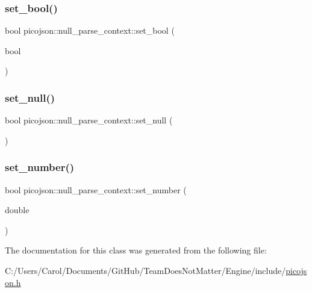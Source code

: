 \subsubsection{\texorpdfstring{set\+\_\+bool()}{set\_bool()}}
{\footnotesize\ttfamily bool picojson\+::null\+\_\+parse\+\_\+context\+::set\+\_\+bool (\begin{DoxyParamCaption}\item[{bool}]{ }\end{DoxyParamCaption})\hspace{0.3cm}{\ttfamily [inline]}}

\hypertarget{classpicojson_1_1null__parse__context_ad142ddadd513e41324f8d0515a19df2c}{}\label{classpicojson_1_1null__parse__context_ad142ddadd513e41324f8d0515a19df2c} 
\subsubsection{\texorpdfstring{set\+\_\+null()}{set\_null()}}
{\footnotesize\ttfamily bool picojson\+::null\+\_\+parse\+\_\+context\+::set\+\_\+null (\begin{DoxyParamCaption}{ }\end{DoxyParamCaption})\hspace{0.3cm}{\ttfamily [inline]}}

\hypertarget{classpicojson_1_1null__parse__context_aeb8326108d42615b1b04cf82d510040c}{}\label{classpicojson_1_1null__parse__context_aeb8326108d42615b1b04cf82d510040c} 
\subsubsection{\texorpdfstring{set\+\_\+number()}{set\_number()}}
{\footnotesize\ttfamily bool picojson\+::null\+\_\+parse\+\_\+context\+::set\+\_\+number (\begin{DoxyParamCaption}\item[{double}]{ }\end{DoxyParamCaption})\hspace{0.3cm}{\ttfamily [inline]}}



The documentation for this class was generated from the following file\+:\begin{DoxyCompactItemize}
\item 
C\+:/\+Users/\+Carol/\+Documents/\+Git\+Hub/\+Team\+Does\+Not\+Matter/\+Engine/include/\hyperlink{picojson_8h}{picojson.\+h}\end{DoxyCompactItemize}
